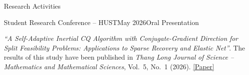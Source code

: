 \documentclass[
a4paper,
12pt,
]{resume}
\begin{document}
    \begin{rSection}{Research Activities}
        
        \begin{rSubsection}{Student Research Conference -- HUST}{May 2026}{Oral Presentation}{}
            \item \textit{``A Self-Adaptive Inertial CQ Algorithm with Conjugate-Gradient Direction for Split Feasibility Problems: Applications to Sparse Recovery and Elastic Net''}. The results of this study have been published in \textit{Thang Long Journal of Science -- Mathematics and Mathematical Sciences}, Vol.~5, No.~1 (2026).
            \href{https://science.thanglong.edu.vn/index.php/volc/article/view/344}{[Paper]}
        \end{rSubsection}
        
    \end{rSection}
    
    
\end{document}
